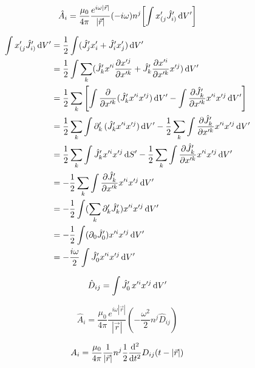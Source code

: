 \begin{equation}
    \hat{A}_i=\frac{\mu_0}{4\pi}\frac{e^{i\omega\left\lvert\vec{r}\right\rvert}}{\left\lvert\vec{r}\right\rvert}(-i\omega)n^j\!\left[\int {x}_{(j}'\hat{J}_{i)}'\,\mathrm{d} V'\right]
\end{equation}

\begin{align}
    \int {x}_{(j}'\hat{J}_{i)}'\,\mathrm{d} V'
    &= \frac{1}{2}\int (\hat{J}_{j}'{x}_{i}'+\hat{J}_{i}'{x}_{j}')\,\mathrm{d} V'\\
    &= \frac{1}{2}\int \sum_{k}(\hat{J}_{k}'x'^{i}\frac{\partial x'^{j}}{\partial x'^{k}}+\hat{J}_{k}'\frac{\partial x'^{i}}{\partial x'^{k}}x'^{j})\,\mathrm{d} V'\\
    &= \frac{1}{2}\sum_{k}\left[\int \frac{\partial }{\partial x'^k}(\hat{J}_{k}'x'^ix'^j)\,\mathrm{d} V'-\int \frac{\partial \hat{J}_{k}'}{\partial x'^k}x'^ix'^j\,\mathrm{d} V'\right]\\
    &= \frac{1}{2}\sum_{k}\int \partial'_k\,(\hat{J}_{k}'x'^ix'^j)\,\mathrm{d} V' -\frac{1}{2}\sum_{k}\int \frac{\partial \hat{J}_{k}'}{\partial x'^k}x'^ix'^j\,\mathrm{d} V'\\
    &= \frac{1}{2}\sum_{k}\int \hat{J}_{k}'x'^ix'^j\,\mathrm{d} S' -\frac{1}{2}\sum_{k}\int \frac{\partial \hat{J}_{k}'}{\partial x'^k}x'^ix'^j\,\mathrm{d} V'\\
    &= -\frac{1}{2}\sum_{k}\int \frac{\partial \hat{J}_{k}'}{\partial x'^k}x'^ix'^j\,\mathrm{d} V'\\
    &= -\frac{1}{2}\int (\sum_{k}\partial'_k\hat{J}_{k}')x'^ix'^j\,\mathrm{d} V'\\
    &= -\frac{1}{2}\int (\partial_0\hat{J}_{0}')x'^ix'^j\,\mathrm{d} V'\\
    &= -\frac{i\omega}{2}\int \hat{J}_{0}'x'^ix'^j\,\mathrm{d} V'
\end{align}

\begin{equation}
    \hat{D}_{ij}=\int \hat{J}_{0}'\,x'^ix'^j\,\mathrm{d} V'
\end{equation}

\begin{equation}
    \hat{A}_i=\frac{\mu_0}{4\pi}\frac{e^{i\omega\left\lvert\vec{r}\right\rvert}}{\left\lvert\vec{r}\right\rvert}(-\frac{\omega^2}{2}n^j\hat{D}_{ij}
    )
\end{equation}

\begin{equation}
    {A}_i=\frac{\mu_0}{4\pi}\frac{1}{\left\lvert\vec{r}\right\rvert}n^j\frac{1}{2}\frac{\mathrm{d}^2}{\mathrm{d} t^2}D_{ij}(t-\left\lvert\vec{r}\right\rvert)
\end{equation}
